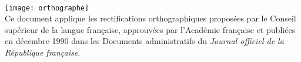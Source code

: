 \
\vfill
\begin{center}
	\texttt{[image: orthographe]}\\[1em]
	Ce document applique les rectifications orthographiques proposées par le Conseil supérieur de la langue française, approuvées par l’Académie française et publiées en décembre 1990 dans les \og Documents administratifs \fg{} du \emph{Journal officiel de la République française}.
\end{center}